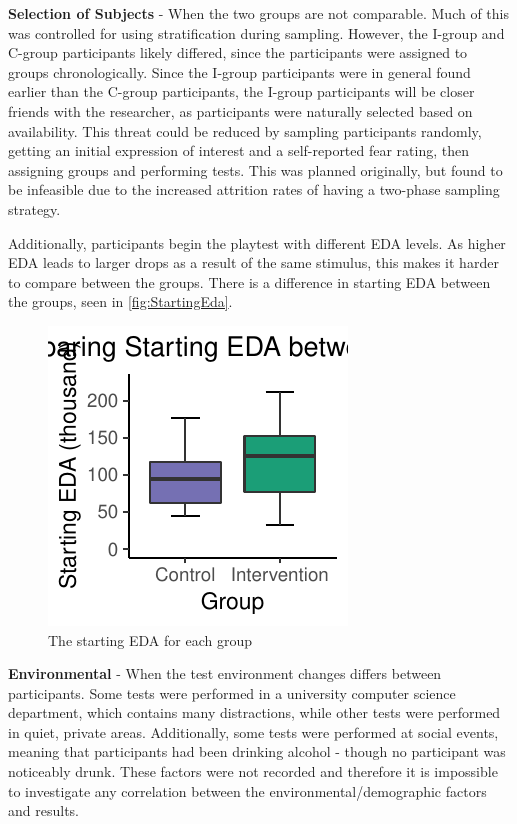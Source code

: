 \documentclass[12pt,a4paper]{article}\usepackage[]{graphicx}\usepackage[]{color}
\makeatletter
\def\maxwidth{ %
  \ifdim\Gin@nat@width>\linewidth
    \linewidth
  \else
    \Gin@nat@width
  \fi
}
\makeatother
\begin{document}
\textbf{Selection of Subjects} - When the two groups are not comparable.
Much of this was controlled for using stratification during sampling.
However, the I-group and C-group participants likely differed, since the participants were assigned to groups chronologically.
Since the I-group participants were in general found earlier than the C-group participants, the I-group participants will be closer friends with the researcher, as participants were naturally selected based on availability.
This threat could be reduced by sampling participants randomly, getting an initial expression of interest and a self-reported fear rating, then assigning groups and performing tests.
This was planned originally, but found to be infeasible due to the increased attrition rates of having a two-phase sampling strategy.

Additionally, participants begin the playtest with different EDA levels.
As higher EDA leads to larger drops as a result of the same stimulus, this makes it harder to compare between the groups.
There is a difference in starting EDA between the groups, seen in \vref{fig:StartingEda}.

\begin{figure}[htb]


{\centering \includegraphics[width=\maxwidth]{figure/StartingEda-1} 

}



	\caption{The starting EDA for each group}
	\label{fig:StartingEda}
\end{figure}

	
\textbf{Environmental} - When the test environment changes differs between participants.
Some tests were performed in a university computer science department, which contains many distractions, while other tests were performed in quiet, private areas.
Additionally, some tests were performed at social events, meaning that participants had been drinking alcohol - though no participant was noticeably drunk.
These factors were not recorded and therefore it is impossible to investigate any correlation between the environmental/demographic factors and results.
\end{document}
